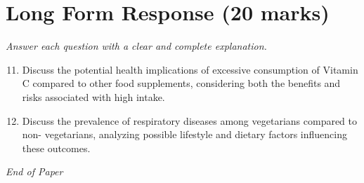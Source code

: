 \documentclass[12pt]{article}
\begin{document}
\section*{Long Form Response (20 marks)}
\textit{Answer each question with a clear and complete explanation.}
\begin{enumerate}[label=\arabic*.]
\setcounter{enumi}{10}
\item Discuss the potential health implications of excessive consumption of Vitamin C compared to other food supplements, considering both the benefits and risks associated with high intake.
\item Discuss the prevalence of respiratory diseases among vegetarians compared to non- vegetarians, analyzing possible lifestyle and dietary factors influencing these outcomes.
\end{enumerate}

\vfill
\noindent\textit{End of Paper}
\end{document}
